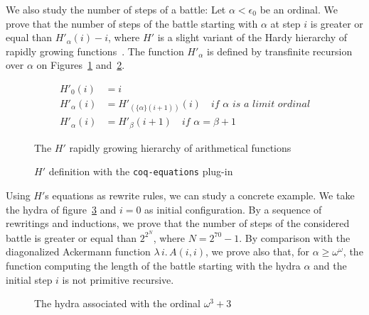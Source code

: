 \documentclass{easychair}
\makeatletter
\newcommand{\inputsnippets}[1]
  {{\setlength{\itemsep}{1pt}\setlength{\parsep}{0pt}%
    \alectryon@copymacros\begin{io}
      \forcsvlist{\item\@inputsnippet}{#1}
    \end{io}}}
\let@old Save definition of 
\newcommand{\@inputsnippet}[1]
  {{\renewenvironment{alectryon}{}{}%
    @old{snippets/#1}}}
\newcommand{\canonseq}[2]{\mbox{$\{#1\}(#2)$}}
\makeatother
\begin{document}
We also study the number of steps of a battle:
Let $\alpha<\epsilon_0$ be an ordinal. 
We prove that  the number of steps of the battle starting with
$\alpha$ at step $i$ is greater or equal than
$H'_\alpha(i)-i$, where $H'$ is a slight variant of the Hardy hierarchy of rapidly growing functions~\cite{BW85, KS81, Promel2013, Wainer1970}.  The function $H'_\alpha$ is defined by transfinite recursion over $\alpha$ on Figures~\ref{fig:hardy-math}
and~\ref{fig:Hprime}.


\begin{figure}[h]
\begin{align}
  H'_0(i) & = i\\
  H'_\alpha(i) &= H'_{(\canonseq{\alpha}{i+1})}(i)  \quad\textit{if $\alpha$ is a limit ordinal}\\
  H'_{\alpha}(i) &=H'_\beta(i+1) \quad\textit{if $\alpha=\beta+1$}
\end{align}  
  \caption{The $H'$ rapidly growing hierarchy of arithmetical functions}
  \label{fig:hardy-math}
\end{figure}


\begin{figure}[h]
  \centering
  \fbox{
    \begin{minipage}[h]{1.0\linewidth}
 \inputsnippets{Hprime/HprimeDef}     
    \end{minipage}}
 \caption{$H'$ definition with the \texttt{coq-equations}
 plug-in~\cite{sozeau:hal-01671777}}
\label{fig:Hprime}
\end{figure}


Using $H'$s equations as rewrite rules, we can study a concrete example. We take the hydra of figure~\ref{fig:start} and $i=0$ as initial configuration. 
By a sequence of rewritings and inductions, we prove that the number of steps of the considered battle is greater or equal than $2^{2^N}$, where $N=2^{70}-1$.
By comparison with the diagonalized Ackermann function $\lambda\,i.\,A(i,i)$, we prove also that, for $\alpha\geq\omega^\omega$, 
the function computing the length of the battle starting with the hydra $\alpha$ and the initial step $i$ is not primitive recursive.

\begin{figure}[h]
  \centering

  \caption{The hydra associated with the ordinal $\omega^3+3$}
  \label{fig:start}
\end{figure}
\end{document}
